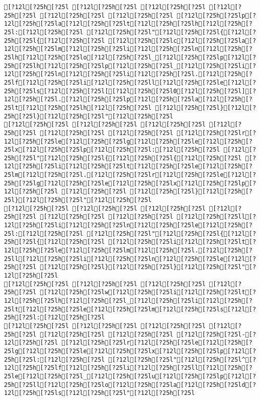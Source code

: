 \documentclass{scrartcl}
\begin{document}
\begin{Verbatim}
[?12l[?25h[?25l [?12l[?25h[?25l [?12l[?25h[?25l [?12l[?25h[?25l [?12l[?25h[?25l [?12l[?25h[?25l [?12l[?25h[?25lp[?12l[?25h[?25la[?12l[?25h[?25lt[?12l[?25h[?25lh[?12l[?25h[?25l:[?12l[?25h[?25l [?12l[?25h[?25l"[?12l[?25h[?25l{[?12l[?25h[?25l{[?12l[?25h[?25l [?12l[?25h[?25lc[?12l[?25h[?25la[?12l[?25h[?25lm[?12l[?25h[?25li[?12l[?25h[?25ln[?12l[?25h[?25lh[?12l[?25h[?25lo[?12l[?25h[?25l_[?12l[?25h[?25lp[?12l[?25h[?25lh[?12l[?25h[?25lp[?12l[?25h[?25l_[?12l[?25h[?25li[?12l[?25h[?25ln[?12l[?25h[?25li[?12l[?25h[?25l.[?12l[?25h[?25lf[?12l[?25h[?25li[?12l[?25h[?25ll[?12l[?25h[?25le[?12l[?25h[?25ls[?12l[?25h[?25l[[?12l[?25h[?25l0[?12l[?25h[?25l][?12l[?25h[?25l.[?12l[?25h[?25lp[?12l[?25h[?25la[?12l[?25h[?25lt[?12l[?25h[?25lh[?12l[?25h[?25l [?12l[?25h[?25l}[?12l[?25h[?25l}[?12l[?25h[?25l"[?12l[?25h[?25l
[?12l[?25h[?25l [?12l[?25h[?25l [?12l[?25h[?25l [?12l[?25h[?25l [?12l[?25h[?25l [?12l[?25h[?25l [?12l[?25h[?25lr[?12l[?25h[?25le[?12l[?25h[?25lg[?12l[?25h[?25le[?12l[?25h[?25lx[?12l[?25h[?25lp[?12l[?25h[?25l:[?12l[?25h[?25l [?12l[?25h[?25l"[?12l[?25h[?25l{[?12l[?25h[?25l{[?12l[?25h[?25l [?12l[?25h[?25li[?12l[?25h[?25lt[?12l[?25h[?25le[?12l[?25h[?25lm[?12l[?25h[?25l.[?12l[?25h[?25lr[?12l[?25h[?25le[?12l[?25h[?25lg[?12l[?25h[?25le[?12l[?25h[?25lx[?12l[?25h[?25lp[?12l[?25h[?25l [?12l[?25h[?25l [?12l[?25h[?25l}[?12l[?25h[?25l}[?12l[?25h[?25l"[?12l[?25h[?25l
[?12l[?25h[?25l [?12l[?25h[?25l [?12l[?25h[?25l [?12l[?25h[?25l [?12l[?25h[?25l [?12l[?25h[?25l [?12l[?25h[?25ll[?12l[?25h[?25li[?12l[?25h[?25ln[?12l[?25h[?25le[?12l[?25h[?25l:[?12l[?25h[?25l [?12l[?25h[?25l"[?12l[?25h[?25l{[?12l[?25h[?25l{[?12l[?25h[?25l [?12l[?25h[?25li[?12l[?25h[?25lt[?12l[?25h[?25le[?12l[?25h[?25lm[?12l[?25h[?25l.[?12l[?25h[?25ll[?12l[?25h[?25li[?12l[?25h[?25ln[?12l[?25h[?25le[?12l[?25h[?25l [?12l[?25h[?25l}[?12l[?25h[?25l}[?12l[?25h[?25l"[?12l[?25h[?25l
[?12l[?25h[?25l [?12l[?25h[?25l [?12l[?25h[?25l [?12l[?25h[?25l [?12l[?25h[?25lw[?12l[?25h[?25li[?12l[?25h[?25lt[?12l[?25h[?25lh[?12l[?25h[?25l_[?12l[?25h[?25li[?12l[?25h[?25lt[?12l[?25h[?25le[?12l[?25h[?25lm[?12l[?25h[?25ls[?12l[?25h[?25l:[?12l[?25h[?25l
[?12l[?25h[?25l [?12l[?25h[?25l [?12l[?25h[?25l [?12l[?25h[?25l [?12l[?25h[?25l [?12l[?25h[?25l [?12l[?25h[?25l-[?12l[?25h[?25l [?12l[?25h[?25lr[?12l[?25h[?25le[?12l[?25h[?25lg[?12l[?25h[?25le[?12l[?25h[?25lx[?12l[?25h[?25lp[?12l[?25h[?25l:[?12l[?25h[?25l [?12l[?25h[?25l"[?12l[?25h[?25l^[?12l[?25h[?25lf[?12l[?25h[?25li[?12l[?25h[?25ll[?12l[?25h[?25le[?12l[?25h[?25l_[?12l[?25h[?25lu[?12l[?25h[?25lp[?12l[?25h[?25ll[?12l[?25h[?25lo[?12l[?25h[?25la[?12l[?25h[?25ld[?12l[?25h[?25ls[?12l[?25h[?25l"[?12l[?25h[?25l

\end{Verbatim}
\end{document}

